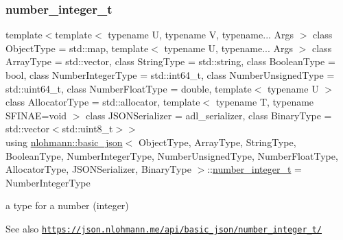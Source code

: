 \subsubsection{\texorpdfstring{number\+\_\+integer\+\_\+t}{number\_integer\_t}}
{\footnotesize\ttfamily template$<$template$<$ typename U, typename V, typename... Args $>$ class Object\+Type = std\+::map, template$<$ typename U, typename... Args $>$ class Array\+Type = std\+::vector, class String\+Type  = std\+::string, class Boolean\+Type  = bool, class Number\+Integer\+Type  = std\+::int64\+\_\+t, class Number\+Unsigned\+Type  = std\+::uint64\+\_\+t, class Number\+Float\+Type  = double, template$<$ typename U $>$ class Allocator\+Type = std\+::allocator, template$<$ typename T, typename S\+F\+I\+N\+A\+E=void $>$ class J\+S\+O\+N\+Serializer = adl\+\_\+serializer, class Binary\+Type  = std\+::vector$<$std\+::uint8\+\_\+t$>$$>$ \\
using \hyperlink{classnlohmann_1_1basic__json}{nlohmann\+::basic\+\_\+json}$<$ Object\+Type, Array\+Type, String\+Type, Boolean\+Type, Number\+Integer\+Type, Number\+Unsigned\+Type, Number\+Float\+Type, Allocator\+Type, J\+S\+O\+N\+Serializer, Binary\+Type $>$\+::\hyperlink{classnlohmann_1_1basic__json_a11e390944da90db83089eb2426a749d3}{number\+\_\+integer\+\_\+t} =  Number\+Integer\+Type}



a type for a number (integer) 

\begin{DoxySeeAlso}{See also}
\href{https://json.nlohmann.me/api/basic_json/number_integer_t/}{\tt https\+://json.\+nlohmann.\+me/api/basic\+\_\+json/number\+\_\+integer\+\_\+t/} 
\end{DoxySeeAlso}
\mbox{\label{classnlohmann_1_1basic__json_ae09af9c23351b7245d9be4d1b2035fef}} 
